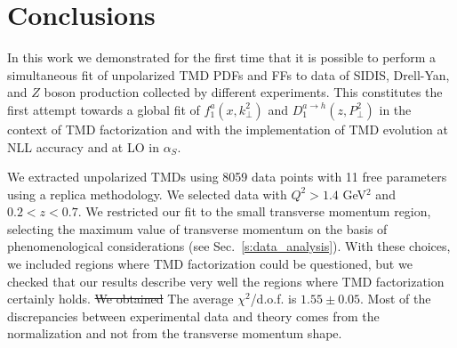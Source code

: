 \documentclass[aps,preprintnumbers,showpacs,nofootinbib,superscriptaddress,floatfix]{revtex4}
\newcommand{\AS}[1]{{\textcolor[rgb]{1,0,1}{#1}}}
\begin{document}





\section{Conclusions}
\label{s:conclusions}


In this work we demonstrated for the first time that it is possible 
to perform a
simultaneous fit of unpolarized TMD PDFs and FFs 
to data of SIDIS, Drell-Yan, and $Z$
boson production collected by different experiments. 
This constitutes the first attempt towards a global fit of 
$f_1^a(x,k_\perp^2)$ and $D_1^{a \to h}(z,P_\perp^2)$ in the context of TMD
factorization and with the implementation of 
TMD evolution at NLL accuracy and at LO in $\alpha_S$.
  
We extracted unpolarized TMDs using 8059 data points with 11 free parameters
using a replica methodology. We selected data with 
$Q^2 > 1.4$ GeV$^2$ and $0.2 < z < 0.7$. We restricted our fit to the small
transverse momentum region, selecting the maximum value of transverse momentum
on the basis of phenomenological considerations
(see Sec.~\ref{s:data_analysis}). With these choices, 
we included regions where TMD
factorization could be questioned, but we checked that our results describe 
very well the regions where TMD factorization certainly holds.  
\AS{\sout{We obtained}} The average $\chi^2$/d.o.f. is $1.55 \pm 0.05$.
Most of the discrepancies between experimental data and theory comes from the
normalization and not from the transverse momentum shape. 
\end{document}

